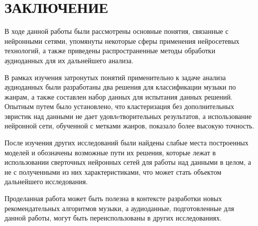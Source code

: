 \chapter*{ \large ЗАКЛЮЧЕНИЕ}
В ходе данной работы были рассмотрены основные понятия, связанные с нейронными сетями, упомянуты некоторые сферы 
применения нейросетевых технологий, а также приведены распространенные методы обработки аудиоданных для их дальнейшего анализа.

В рамках изучения затронутых понятий применительно к задаче анализа аудиоданных были разработаны два решения для классификации музыки по жанрам, а также составлен набор данных для испытания данных решений. Опытным путем было установлено, что кластеризация без дополнительных эвристик над данными не дает
удовлeтворительных результатов, а использование нейронной сети, обученной с метками жанров, показало более высокую точность.

После изучения других исследований были найдены слабые места построенных моделей и обозначены возможные пути их решения, которые лежат в использовании сверточных нейронных сетей
для работы над данными в целом, а не с полученными из них характеристиками, что может стать объектом дальнейшего исследования.

Проделанная работа может быть полезна в контексте разработки новых рекомендательных алгоритмов музыки, а аудиоданные, подготовленные для данной работы, могут быть переиспользованы в других исследованиях.